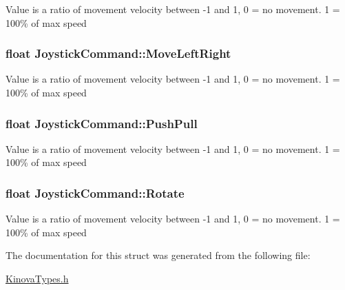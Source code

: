 Value is a ratio of movement velocity between -\/1 and 1, 0 = no movement. 1 = 100\% of max speed \hypertarget{struct_joystick_command_a6ca311d7940ce3c7ea6e9a3719388181}{
\subsubsection[{Move\-Left\-Right}]{\setlength{\rightskip}{0pt plus 5cm}float Joystick\-Command\-::\-Move\-Left\-Right}}\label{struct_joystick_command_a6ca311d7940ce3c7ea6e9a3719388181}
Value is a ratio of movement velocity between -\/1 and 1, 0 = no movement. 1 = 100\% of max speed \hypertarget{struct_joystick_command_af530128a7a89e383f88a4c2b798a66b4}{
\subsubsection[{Push\-Pull}]{\setlength{\rightskip}{0pt plus 5cm}float Joystick\-Command\-::\-Push\-Pull}}\label{struct_joystick_command_af530128a7a89e383f88a4c2b798a66b4}
Value is a ratio of movement velocity between -\/1 and 1, 0 = no movement. 1 = 100\% of max speed \hypertarget{struct_joystick_command_a02fece0bcf6cfc2135f294a3dbe9db4e}{
\subsubsection[{Rotate}]{\setlength{\rightskip}{0pt plus 5cm}float Joystick\-Command\-::\-Rotate}}\label{struct_joystick_command_a02fece0bcf6cfc2135f294a3dbe9db4e}
Value is a ratio of movement velocity between -\/1 and 1, 0 = no movement. 1 = 100\% of max speed 

The documentation for this struct was generated from the following file\-:\begin{DoxyCompactItemize}
\item 
\hyperlink{_kinova_types_8h}{Kinova\-Types.\-h}\end{DoxyCompactItemize}
